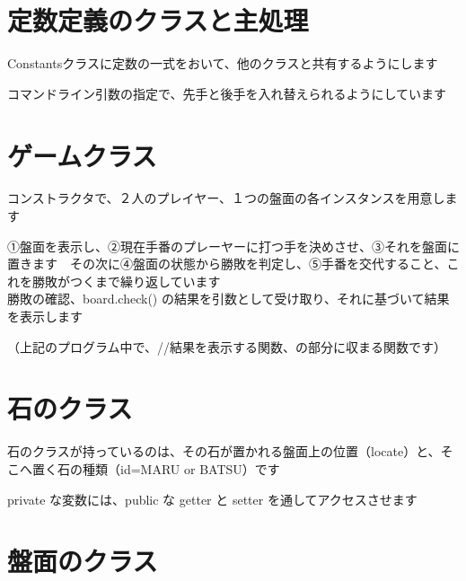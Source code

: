 \documentclass[uplatex,a4paper,11pt,oneside,openany]{jsbook}
\begin{document}
\section{定数定義のクラスと主処理}

Constantsクラスに定数の一式をおいて、他のクラスと共有するようにします



コマンドライン引数の指定で、先手と後手を入れ替えられるようにしています



\section{ゲームクラス}

コンストラクタで、２人のプレイヤー、１つの盤面の各インスタンスを用意します



①盤面を表示し、②現在手番のプレーヤーに打つ手を決めさせ、③それを盤面に置きます　その次に④盤面の状態から勝敗を判定し、⑤手番を交代すること、これを勝敗がつくまで繰り返しています\\

勝敗の確認、board.check() の結果を引数として受け取り、それに基づいて結果を表示します

（上記のプログラム中で、//結果を表示する関数、の部分に収まる関数です）



\section{石のクラス}

石のクラスが持っているのは、その石が置かれる盤面上の位置（locate）と、そこへ置く石の種類（id=MARU or BATSU）です

private な変数には、public な getter と setter を通してアクセスさせます



\section{盤面のクラス}
\end{document}
